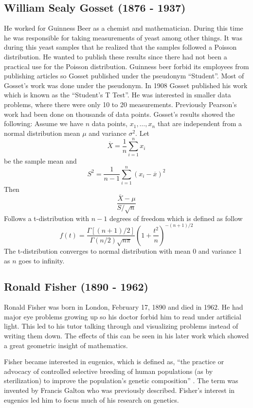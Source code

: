 \documentclass{article}
\begin{document}
\subsection{William Sealy Gosset (1876 - 1937)}
He worked for Guinness Beer as a chemist and mathematician.
During this time he was responsible for taking measurements of yeast among other things.
It was during this yeast samples that he realized that the samples followed a Poisson distribution. \cite{salsburg_2002}
He wanted to publish these results since there had not been a practical use for the Poisson distribution.
Guinness beer forbid its employees from publishing articles so Gosset published under the pseudonym ``Student''.
Most of Gosset's work was done under the pseudonym.
In 1908 Gosset published his work which is known as the ``Student's T Test''.
He was interested in smaller data problems, where there were only 10 to 20 measurements.
Previously Pearson's work had been done on thousands of data points.
Gosset's results showed the following: Assume we have $n$ data points, $x_1,\ldots, x_n$ that are independent from a normal distribution mean $\mu$ and variance $\sigma^2$. Let 
$$
\overline{X} = \frac{1}{n} \sum_{i = 1}^n x_i
$$
be the sample mean
and
$$
S^2 = \frac{1}{n-1} \sum_{i = 1}^n(x_i - \overline{x})^2
$$
Then
$$
\frac{\overline{X} - \mu}{S/\sqrt{n}}
$$
Follows a t-distribution with $n-1$ degrees of freedom which is defined as follow
$$
f(t) = \frac{\Gamma[(n + 1) / 2]}{\Gamma(n / 2) \sqrt{n\pi}} \left( 1 + \frac{t^2}{n} \right)^{-(n + 1) / 2}
$$
The t-distribution converges to normal distribution with mean 0 and variance 1 as $n$ goes to infinity.

\subsection{Ronald Fisher (1890 - 1962)}
Ronald Fisher was born in London, February 17, 1890 and died in 1962. \cite{britannica_fisher}
He had major eye problems growing up so his doctor forbid him to read under artificial light. \cite{salsburg_2002}
This led to his tutor talking through and visualizing problems instead of writing them down.
The effects of this can be seen in his later work which showed a great geometric insight of mathematics.

Fisher became interested in eugenics, which is defined as, ``the practice or advocacy of controlled selective breeding of human populations (as by sterilization) to improve the population's genetic composition'' \cite{wiki:eugenics}.
The term was invented by Francis Galton who was previously described.
Fisher's interest in eugenics led him to focus much of his research on genetics.
\end{document}
